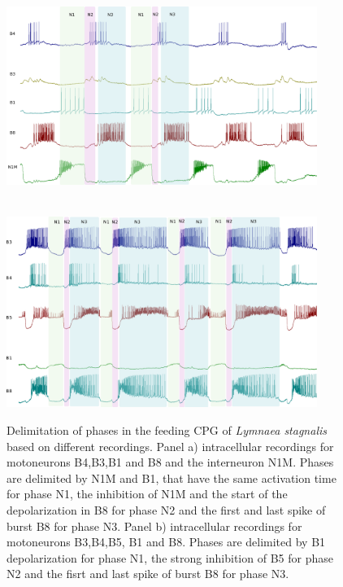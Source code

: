 \begin{figure}[bth!]
	\centering
	\begin{minipage}[b]{\textwidth}
		\\
		\centering
		\includegraphics[width=0.9\textwidth]{img/invariants/example_phases_1.pdf}
	\end{minipage}
	\vspace{20pt}
	\begin{minipage}[b]{\textwidth}
		\\
		\centering
		\includegraphics[width=0.9\textwidth]{img/invariants/example_phases_2.pdf}
	\end{minipage}
	\caption{Delimitation of phases in the feeding CPG of \textit{Lymnaea stagnalis} based on different recordings. Panel a) intracellular recordings for motoneurons B4,B3,B1 and B8 and the interneuron N1M. Phases are delimited by N1M and B1, that have the same activation time for phase N1, the inhibition of N1M and the start of the depolarization in B8 for phase N2 and the first and last spike of burst B8 for phase N3. Panel b) intracellular recordings for motoneurons B3,B4,B5, B1 and B8. Phases are delimited by B1 depolarization for phase N1, the strong inhibition of B5 for phase N2 and the fisrt and last spike of burst B8 for phase N3.}
	\label{fig:example lymnaea phases recording}
\end{figure}

